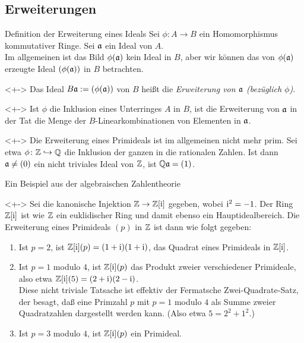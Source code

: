 \subsection{Erweiterungen}

\begin{frame}{Definition der Erweiterung eines Ideals}
	Sei \(\phi\colon A \to B\) ein Homomorphismus kommutativer Ringe.
	Sei \(\mathfrak{a}\) ein Ideal von \(A\).
	\\
	Im allgemeinen ist das Bild \(\phi(\mathfrak{a})\) kein Ideal in \(B\), aber wir 
	können das von \(\phi(\mathfrak{a})\) erzeugte Ideal \((\phi(\mathfrak{a}))\) in
	\(B\) betrachten.
	\begin{definition}<+->
		Das Ideal \(B \mathfrak{a} := (\phi(\mathfrak{a}))\) von \(B\) heißt die
		\emph{Erweiterung von \(\mathfrak{a}\) (bezüglich \(\phi\))}.
	\end{definition}
	\begin{remark}<+->
		Ist \(\phi\) die Inklusion eines Unterringes \(A\) in \(B\), ist die 
		Erweiterung von \(\mathfrak{a}\) in der Tat die Menge der
		\(B\)\nobreakdash-Linearkombinationen von Elementen in \(\mathfrak{a}\).
	\end{remark}
	\begin{example}<+->
		Die Erweiterung eines Primideals ist im allgemeinen nicht mehr prim.
		Sei etwa \(\phi\colon \mathbb Z \hookrightarrow \mathbb Q\) die Inklusion der ganzen in die
		rationalen Zahlen. Ist dann \(\mathfrak{a} \neq (0)\) ein nicht triviales
		Ideal von \(\mathbb Z\), ist \(\mathbb Q \mathfrak{a} = (1)\).
	\end{example}
\end{frame}

\begin{frame}{Ein Beispiel aus der algebraischen Zahlentheorie}
	\begin{example}<+->
		Sei die kanonische Injektion \(\mathbb Z \to \mathbb Z[\mathrm{i}]\) gegeben, wobei \(\mathrm{i}^2 = -1\).
		Der Ring \(\mathbb Z[\mathrm{i}]\) ist wie \(\mathbb Z\) ein euklidischer Ring
		und damit ebenso ein Hauptidealbereich. Die Erweiterung eines
		Primideals \((p)\) in \(\mathbb Z\) ist dann wie folgt gegeben:
		\begin{enumerate}[<+->]
		\item
			Ist \(p = 2\), ist \(\mathbb Z[\mathrm{i}](p) = (1 + \mathrm{i})(1 + \mathrm{i})\), das Quadrat eines
			Primideals in \(\mathbb Z[\mathrm{i}]\).
		\item
			Ist \(p = 1\) modulo \(4\), ist \(\mathbb Z[\mathrm{i}](p)\) das Produkt zweier
			verschiedener Primideale, also etwa \(\mathbb Z[\mathrm{i}](5) = (2 + \mathrm{i})(2 - \mathrm{i})\).
			\\
			Diese nicht triviale Tatsache ist effektiv der Fermatsche
			Zwei-Quadrate-Satz, der besagt, daß eine Primzahl \(p\) mit \(p = 1\)
			modulo \(4\) als Summe zweier Quadratzahlen dargestellt werden 
			kann. (Also etwa \(5 = 2^2 + 1^2\).)
		\item
			Ist \(p = 3\) modulo \(4\), ist \(\mathbb Z[\mathrm{i}](p)\) ein Primideal.
		\end{enumerate}
	\end{example}
\end{frame}

